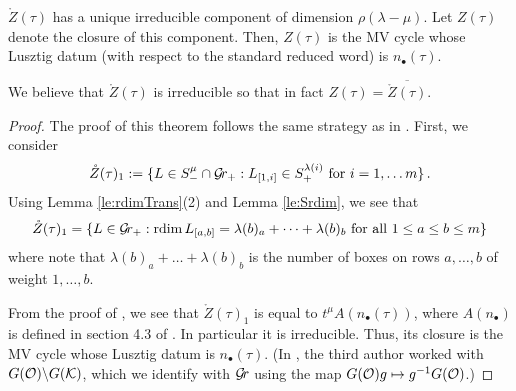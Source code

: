 \documentclass{article} %
\begin{document}
\begin{proposition}
    \label{pr:newmvdes}
    $ \mathring Z(\tau)$ has a unique irreducible component of dimension $ \rho(\lambda - \mu)$.  Let $ Z(\tau)$ denote the closure of this component.  Then, 
    $Z(\tau)$ is the MV cycle whose Lusztig datum (with respect to the standard reduced word) is $n_\bullet(\tau)$. 
\end{proposition}
\begin{remark}
We believe that $ \mathring Z(\tau)$ is irreducible so that in fact $ Z(\tau) = \overline{ \mathring Z(\tau)}$.
\end{remark}

\begin{proof}
    The proof of this theorem follows the same strategy as in \cite{dranowski2020generalized}.
% 
First, we consider 
\begin{equation*}
\mathring Z(\tau)_1 := \{ L \in S^\mu_- \cap \mathcal{G}\!r_+ : L_{[1,i]} \in S_+^{\lambda(i)} \text{ for } i = 1, \dots m\} \,. 
\end{equation*}
% 
Using Lemma \ref{le:rdimTrans}(2) and Lemma \ref{le:Srdim}, we see that
$$
\mathring Z(\tau)_1 = \{ L \in \mathcal{G}\!r_+ : \operatorname{rdim} L_{[a,b]} = \lambda(b)_a + \dots + \lambda(b)_b \text{ for all $ 1 \le a \le b \le m $} \}
$$
where note that $ \lambda(b)_a + \dots + \lambda(b)_b$ is the number of boxes on rows $ a, \dots, b$ of weight $ 1, \dots, b $.

From  the proof of \cite[Proposition 9.6]{kamnitzer2010mirkovic}, we see that $ \mathring Z(\tau)_1$ is equal to $ t^\mu A(n_\bullet(\tau))$, where $ A(n_\bullet)$ is defined in section 4.3 of \cite{kamnitzer2010mirkovic}. In particular it is irreducible. Thus, its closure is the MV cycle whose Lusztig datum is $ n_\bullet(\tau) $. (In \cite{kamnitzer2010mirkovic}, the third author worked with $  G(\mathcal O) \backslash G(\mathcal K)$, which we identify with $ \mathcal{G}\!r $ using the map $ G(\mathcal O) g \mapsto g^{-1} G(\mathcal O)$.) 


\end{proof}
\end{document}
